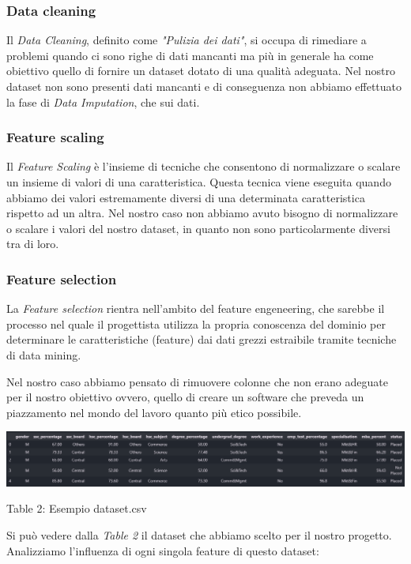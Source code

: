 \documentclass[12pt]{article}
\begin{document}
\subsubsection{Data cleaning}
Il \textit{Data Cleaning}, definito come \textit{"Pulizia dei dati"}, si occupa di rimediare a problemi quando ci sono righe
di dati mancanti ma più in generale ha come obiettivo quello di fornire un dataset dotato di una qualità adeguata.
Nel nostro dataset non sono presenti dati mancanti e di conseguenza non abbiamo effettuato la fase di \textit{Data Imputation}, che
sui dati.

\subsubsection{Feature scaling}
Il \textit{Feature Scaling} è l'insieme di tecniche che consentono di normalizzare o scalare un insieme di valori di una caratteristica.
Questa tecnica viene eseguita quando abbiamo dei valori estremamente diversi di una determinata caratteristica rispetto ad un altra.
Nel nostro caso non abbiamo avuto bisogno di normalizzare o scalare i valori del nostro dataset, in quanto non sono particolarmente diversi tra di loro.


\subsubsection{Feature selection}
La \textit{Feature selection} rientra nell'ambito del feature engeneering, che sarebbe il processo nel quale il progettista
utilizza la propria conoscenza del dominio per determinare le caratteristiche (feature) dai dati grezzi estraibile tramite tecniche
di data mining.

Nel nostro caso abbiamo pensato di rimuovere colonne che non erano adeguate per il nostro obiettivo ovvero, quello di creare
un software che preveda un piazzamento nel mondo del lavoro quanto più etico possibile.

\begin{center}
    \includegraphics[scale=0.46]{csvimage.png}

    Table 2: Esempio dataset.csv
\end{center}

Si può vedere dalla \textit{Table 2} il dataset che abbiamo scelto per il nostro progetto.
Analizziamo l'influenza di ogni singola feature di questo dataset:
\end{document}
